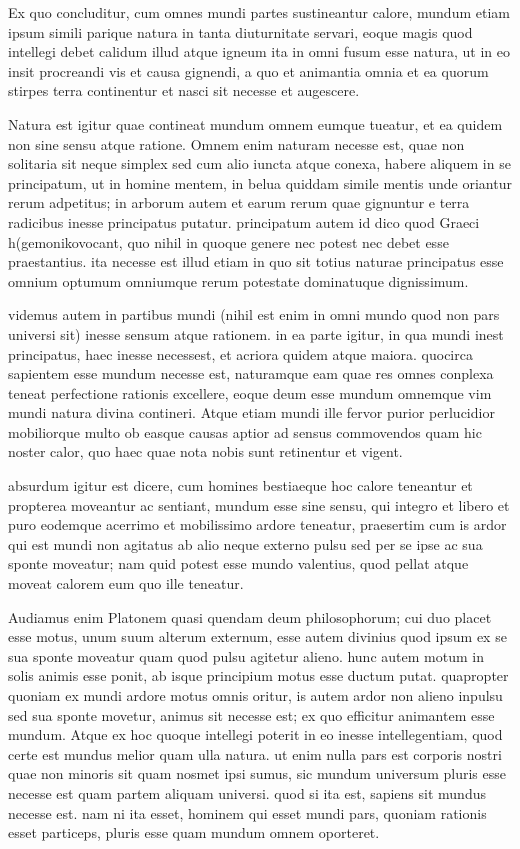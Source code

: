  Ex quo concluditur, cum omnes mundi partes sustineantur calore, mundum etiam ipsum simili parique natura in tanta diuturnitate servari, eoque magis quod intellegi debet calidum illud atque igneum ita in omni fusum esse natura, ut in eo insit procreandi vis et causa gignendi, a quo et animantia omnia et ea quorum stirpes terra continentur et nasci sit necesse et augescere.

 Natura est igitur quae contineat mundum omnem eumque tueatur, et ea quidem non sine sensu atque ratione. Omnem enim naturam necesse est, quae non solitaria sit neque simplex sed cum alio iuncta atque conexa, habere aliquem in se principatum, ut in homine mentem, in belua quiddam simile mentis unde oriantur rerum adpetitus; in arborum autem et earum rerum quae gignuntur e terra radicibus inesse principatus putatur. principatum autem id dico quod Graeci h(gemoniko\n vocant, quo nihil in quoque genere nec potest nec debet esse praestantius. ita necesse est illud etiam in quo sit totius naturae principatus esse omnium optumum omniumque rerum potestate dominatuque dignissimum.

 videmus autem in partibus mundi (nihil est enim in omni mundo quod non pars universi sit) inesse sensum atque rationem. in ea parte igitur, in qua mundi inest principatus, haec inesse necessest, et acriora quidem atque maiora. quocirca sapientem esse mundum necesse est, naturamque eam quae res omnes conplexa teneat perfectione rationis excellere, eoque deum esse mundum omnemque vim mundi natura divina contineri. Atque etiam mundi ille fervor purior perlucidior mobiliorque multo ob easque causas aptior ad sensus commovendos quam hic noster calor, quo haec quae nota nobis sunt retinentur et vigent.

 absurdum igitur est dicere, cum homines bestiaeque hoc calore teneantur et propterea moveantur ac sentiant, mundum esse sine sensu, qui integro et libero et puro eodemque acerrimo et mobilissimo ardore teneatur, praesertim cum is ardor qui est mundi non agitatus ab alio neque externo pulsu sed per se ipse ac sua sponte moveatur; nam quid potest esse mundo valentius, quod pellat atque moveat calorem eum quo ille teneatur.

 Audiamus enim Platonem quasi quendam deum philosophorum; cui duo placet esse motus, unum suum alterum externum, esse autem divinius quod ipsum ex se sua sponte moveatur quam quod pulsu agitetur alieno. hunc autem motum in solis animis esse ponit, ab isque principium motus esse ductum putat. quapropter quoniam ex mundi ardore motus omnis oritur, is autem ardor non alieno inpulsu sed sua sponte movetur, animus sit necesse est; ex quo efficitur animantem esse mundum. Atque ex hoc quoque intellegi poterit in eo inesse intellegentiam, quod certe est mundus melior quam ulla natura. ut enim nulla pars est corporis nostri quae non minoris sit quam nosmet ipsi sumus, sic mundum universum pluris esse necesse est quam partem aliquam universi. quod si ita est, sapiens sit mundus necesse est. nam ni ita esset, hominem qui esset mundi pars, quoniam rationis esset particeps, pluris esse quam mundum omnem oporteret.


